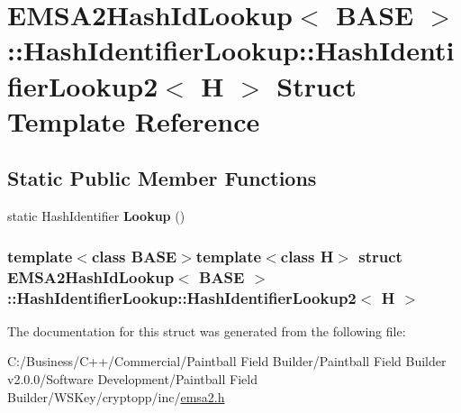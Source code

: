 \hypertarget{struct_e_m_s_a2_hash_id_lookup_1_1_hash_identifier_lookup_1_1_hash_identifier_lookup2}{
\section{EMSA2HashIdLookup$<$ BASE $>$::HashIdentifierLookup::HashIdentifierLookup2$<$ H $>$ Struct Template Reference}
\label{struct_e_m_s_a2_hash_id_lookup_1_1_hash_identifier_lookup_1_1_hash_identifier_lookup2}
}
\subsection*{Static Public Member Functions}
\begin{DoxyCompactItemize}
\item 
\hypertarget{struct_e_m_s_a2_hash_id_lookup_1_1_hash_identifier_lookup_1_1_hash_identifier_lookup2_a685bc6bbe62f174155e90e61be2accef}{
static HashIdentifier {\bfseries Lookup} ()}
\label{struct_e_m_s_a2_hash_id_lookup_1_1_hash_identifier_lookup_1_1_hash_identifier_lookup2_a685bc6bbe62f174155e90e61be2accef}

\end{DoxyCompactItemize}
\subsubsection*{template$<$class BASE$>$template$<$class H$>$ struct EMSA2HashIdLookup$<$ BASE $>$::HashIdentifierLookup::HashIdentifierLookup2$<$ H $>$}



The documentation for this struct was generated from the following file:\begin{DoxyCompactItemize}
\item 
C:/Business/C++/Commercial/Paintball Field Builder/Paintball Field Builder v2.0.0/Software Development/Paintball Field Builder/WSKey/cryptopp/inc/\hyperlink{emsa2_8h}{emsa2.h}\end{DoxyCompactItemize}
